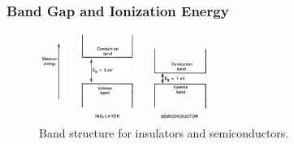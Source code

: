 \subsubsection{Band Gap and Ionization Energy}
\begin{figure}[ht]
    \centering
    \includegraphics[width=0.5\textwidth]{images/semiconductor_band_structure.png}
    \caption{Band structure for insulators and semiconductors.}
    \label{fig:semiconductor_band_structure}
\end{figure}
